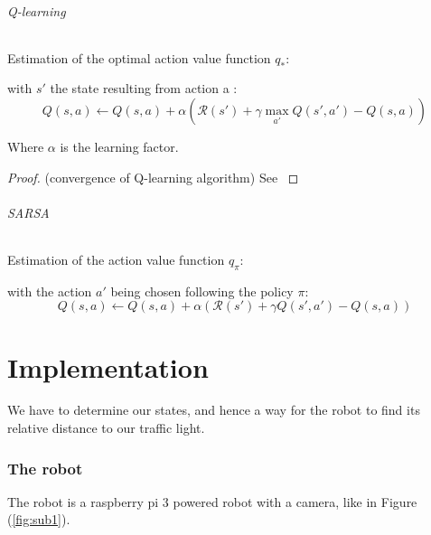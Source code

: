 \documentclass[14pt,a4paper]{article}
\theoremstyle{definition}
\begin{document}
\paragraph{Q-learning} Estimation of the optimal action value function $q_*$:


with $s'$ the state resulting from action a :
\begin{equation}
Q(s,a) \leftarrow Q(s,a) + \alpha \left( \mathcal{R}(s') + \gamma \max_{a'}Q(s',a') - Q(s,a) \right) 
\label{eq:ql}
\end{equation}

Where $\alpha$ is the learning factor.

\begin{proof} (convergence of Q-learning algorithm)
See \citep{Watkins_article}
\end{proof}


\paragraph{SARSA} Estimation of the action value function $q_{\pi}$:

with the action $a'$ being chosen following the policy $\pi$:
\begin{equation}
Q(s,a) \leftarrow Q(s,a) + \alpha \left( \mathcal{R}(s') + \gamma Q(s',a') - Q(s,a) \right)
\end{equation}



\newpage
\part*{Implementation}
We have to determine our states, and hence a way for the robot to find its relative distance to our traffic light.
\section{The robot}
The robot is a raspberry pi 3 powered robot with a camera, like in Figure (\ref{fig:sub1}).
\end{document}
